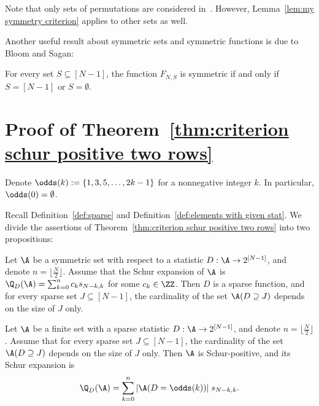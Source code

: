 Note that only sets of permutations are considered in~\cite{my_pattern_theorem}. However, Lemma~\ref{lem:my symmetry criterion} applies to other sets as well.



    

    

Another useful result about symmetric sets and symmetric functions is due to Bloom and Sagan:
\begin{lemma}
\label{lem:singleton not symmetric}
    
    For every set $S \subseteq [N-1]$, the function $F_{N,S}$ is symmetric if and only if $S=[N-1]$ or $S=\emptyset$.
\end{lemma}


\section{Proof of Theorem~\ref{thm:criterion schur positive two rows}}
\label{sec:criterion two rows}

Denote $\odds(k) := \{1,3,5,\dots, 2k-1\}$ for a nonnegative integer $k$. In particular, $\odds(0) = \emptyset$.

Recall Definition~\ref{def:sparse} and Definition~\ref{def:elements with given stat}. We divide the assertions of Theorem~\ref{thm:criterion schur positive two rows} into two propositions:
\begin{lemma}
\label{lem:if schur positive two rows then sparse and good sizes}
    Let $\A$ be a symmetric set with respect to a statistic $D:\A \to 2^{[N-1]}$, and denote $n = \lfloor\frac{N}{2} \rfloor$. Assume that the Schur expansion of $\A$ is $\Q_{D}(\A) = \sum_{k=0}^n c_k s_{N-k,k}$ for some $c_k \in \ZZ$. Then
    $D$ is a sparse function, and for every sparse set $J \subseteq [N-1]$, the cardinality of the set $\A(D \supseteq J)$ depends on the size of $J$ only.
\end{lemma}
\begin{lemma}
\label{lem:if sparse and good sizes then schur positive two rows}
    Let $\A$ be a finite set with a sparse statistic $D:\A \to 2^{[N-1]}$, and denote $n = \lfloor\frac{N}{2} \rfloor$. Assume that for every sparse set $J \subseteq [N-1]$, the cardinality of the set $\A(D \supseteq J)$ depends on the size of $J$ only.
    Then $\A$ is Schur-positive, and its Schur expansion is
    \[
        \Q_{D} (\A) = \sum_{k=0}^n |\A(D=\odds(k))|\; s_{N-k,k}.
    \]
\end{lemma}

